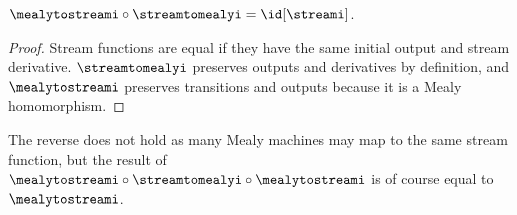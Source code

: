 \begin{proposition}\label{prop:mealy-stream-id}
    \(\mealytostreami \circ \streamtomealyi = \id[\streami]\).
\end{proposition}
\begin{proof}
    Stream functions are equal if they have the same initial output and
    stream derivative.
    \(\streamtomealyi\) preserves outputs and derivatives by definition, and
    \(\mealytostreami\) preserves transitions and outputs because it is a Mealy
    homomorphism.
\end{proof}

The reverse does not hold as many Mealy machines may map to the same stream
function, but the result of
\(\mealytostreami \circ \streamtomealyi \circ \mealytostreami\) is of course
equal to \(\mealytostreami\).
